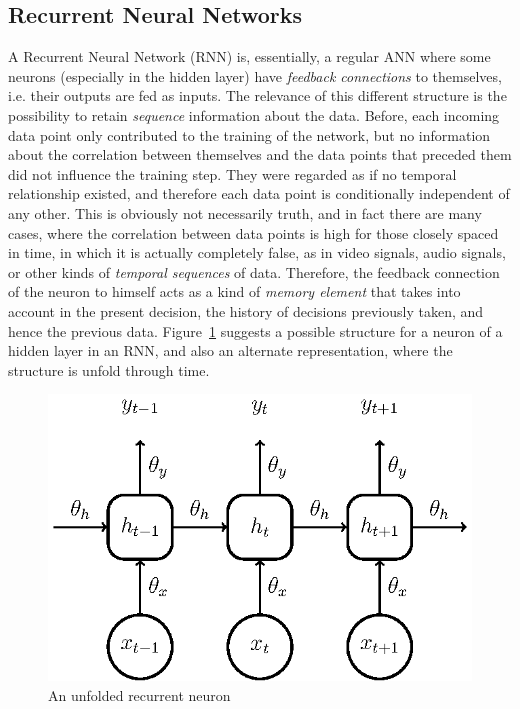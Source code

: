 \subsection{Recurrent Neural Networks}\label{sec:theorBack_rnn}
A Recurrent Neural Network (RNN) is, essentially, a regular ANN where some neurons (especially in the hidden layer) have \emph{feedback connections} to themselves, i.e. their outputs are fed as inputs. The relevance of this different structure is the possibility to retain \emph{sequence} information about the data. Before, each incoming data point only contributed to the training of the network, but no information about the correlation between themselves and the data points that preceded them did not influence the training step. They were regarded as if no temporal relationship existed, and therefore each data point is conditionally independent of any other. This is obviously not necessarily truth, and in fact there are many cases, where the correlation between data points is high for those closely spaced in time, in which it is actually completely false, as in video signals, audio signals, or other kinds of \emph{temporal sequences} of data. Therefore, the feedback connection of the neuron to himself acts as a kind of \emph{memory element} that takes into account in the present decision, the history of decisions previously taken, and hence the previous data. 
Figure~\ref{fig:recneuron} suggests a possible structure for a neuron of a hidden layer in an RNN, and also an alternate representation, where the structure is unfold through time.

\begin{figure}[H]
	\centering
	\includegraphics[width=0.9\linewidth]{figures/recneuron_unf.eps}
    \caption{An unfolded recurrent neuron}
	\label{fig:recneuron}
\end{figure}

